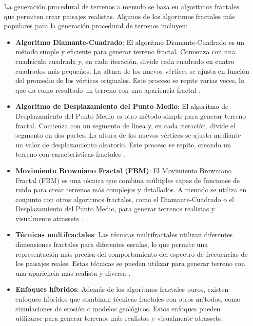 La generación procedural de terrenos a menudo se basa en algoritmos fractales que permiten crear paisajes realistas. Algunos de los algoritmos fractales más populares para la generación procedural de terrenos incluyen:

\begin{itemize}
    \item \textbf{Algoritmo Diamante-Cuadrado}: El algoritmo Diamante-Cuadrado es un método simple y eficiente para generar terreno fractal. Comienza con una cuadrícula cuadrada y, en cada iteración, divide cada cuadrado en cuatro cuadrados más pequeños. La altura de los nuevos vértices se ajusta en función del promedio de los vértices originales. Este proceso se repite varias veces, lo que da como resultado un terreno con una apariencia fractal \cite{DiamanteCuadrado}.
    
    \item \textbf{Algoritmo de Desplazamiento del Punto Medio}: El algoritmo de Desplazamiento del Punto Medio es otro método simple para generar terreno fractal. Comienza con un segmento de línea y, en cada iteración, divide el segmento en dos partes. La altura de los nuevos vértices se ajusta mediante un valor de desplazamiento aleatorio. Este proceso se repite, creando un terreno con características fractales \cite{DesplazamientoPuntoMedio}.
    
    \item \textbf{Movimiento Browniano Fractal (FBM)}: El Movimiento Browniano Fractal (FBM) es una técnica que combina múltiples capas de funciones de ruido para crear terrenos más complejos y detallados. A menudo se utiliza en conjunto con otros algoritmos fractales, como el Diamante-Cuadrado o el Desplazamiento del Punto Medio, para generar terrenos realistas y visualmente atrassets \cite{TFractionalBrownianMotion}.
    
    \item \textbf{Técnicas multifractales}: Las técnicas multifractales utilizan diferentes dimensiones fractales para diferentes escalas, lo que permite una representación más precisa del comportamiento del espectro de frecuencias de los paisajes reales. Estas técnicas se pueden utilizar para generar terreno con una apariencia más realista y diversa \cite{calvet2008multifractal}.
    
    \item \textbf{Enfoques híbridos}: Además de los algoritmos fractales puros, existen enfoques híbridos que combinan técnicas fractales con otros métodos, como simulaciones de erosión o modelos geológicos. Estos enfoques pueden utilizarse para generar terrenos más realistas y visualmente atrassets.
\end{itemize}

